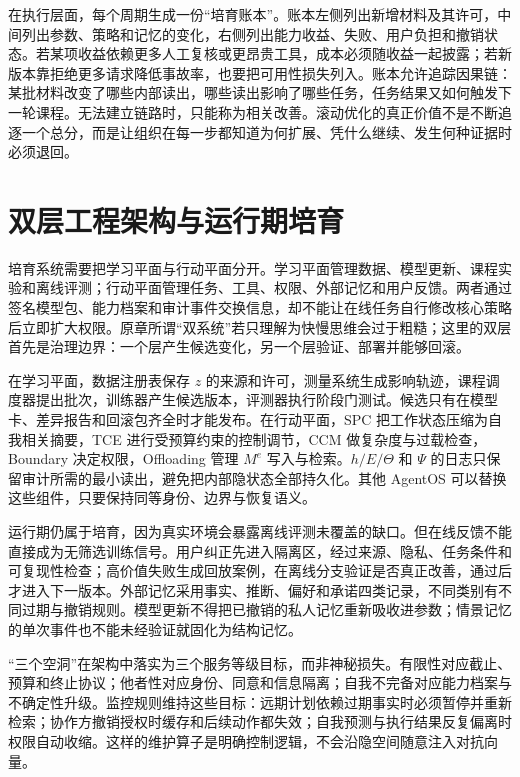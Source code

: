 在执行层面，每个周期生成一份“培育账本”。账本左侧列出新增材料及其许可，中间列出参数、策略和记忆的变化，右侧列出能力收益、失败、用户负担和撤销状态。若某项收益依赖更多人工复核或更昂贵工具，成本必须随收益一起披露；若新版本靠拒绝更多请求降低事故率，也要把可用性损失列入。账本允许追踪因果链：某批材料改变了哪些内部读出，哪些读出影响了哪些任务，任务结果又如何触发下一轮课程。无法建立链路时，只能称为相关改善。滚动优化的真正价值不是不断追逐一个总分，而是让组织在每一步都知道为何扩展、凭什么继续、发生何种证据时必须退回。

\section{双层工程架构与运行期培育}
\label{sec:engineering_topological_drilling}

培育系统需要把学习平面与行动平面分开。学习平面管理数据、模型更新、课程实验和离线评测；行动平面管理任务、工具、权限、外部记忆和用户反馈。两者通过签名模型包、能力档案和审计事件交换信息，却不能让在线任务自行修改核心策略后立即扩大权限。原章所谓“双系统”若只理解为快慢思维会过于粗糙；这里的双层首先是治理边界：一个层产生候选变化，另一个层验证、部署并能够回滚。

在学习平面，数据注册表保存 $z$ 的来源和许可，测量系统生成影响轨迹，课程调度器提出批次，训练器产生候选版本，评测器执行阶段门测试。候选只有在模型卡、差异报告和回滚包齐全时才能发布。在行动平面，SPC 把工作状态压缩为自我相关摘要，TCE 进行受预算约束的控制调节，CCM 做复杂度与过载检查，Boundary 决定权限，Offloading 管理 $M^e$ 写入与检索。$h/E/\Theta$ 和 $\Psi$ 的日志只保留审计所需的最小读出，避免把内部隐状态全部持久化。其他 AgentOS 可以替换这些组件，只要保持同等身份、边界与恢复语义。

运行期仍属于培育，因为真实环境会暴露离线评测未覆盖的缺口。但在线反馈不能直接成为无筛选训练信号。用户纠正先进入隔离区，经过来源、隐私、任务条件和可复现性检查；高价值失败生成回放案例，在离线分支验证是否真正改善，通过后才进入下一版本。外部记忆采用事实、推断、偏好和承诺四类记录，不同类别有不同过期与撤销规则。模型更新不得把已撤销的私人记忆重新吸收进参数；情景记忆的单次事件也不能未经验证就固化为结构记忆。

“三个空洞”在架构中落实为三个服务等级目标，而非神秘损失。有限性对应截止、预算和终止协议；他者性对应身份、同意和信息隔离；自我不完备对应能力档案与不确定性升级。监控规则维持这些目标：远期计划依赖过期事实时必须暂停并重新检索；协作方撤销授权时缓存和后续动作都失效；自我预测与执行结果反复偏离时权限自动收缩。这样的维护算子是明确控制逻辑，不会沿隐空间随意注入对抗向量。

